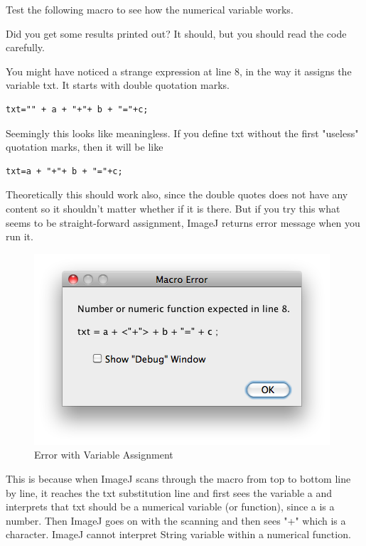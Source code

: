 \documentclass[11pt,a4paper,oneside]{report}
\begin{document}
Test the following macro to see how the numerical variable works. 

Did you get some results printed out? It should, but you should read the code carefully. 

You might have noticed a strange expression at line 8, in the way it assigns the variable txt. It starts with double quotation marks. \\
%
\begin{lstlisting}[numbers=none]
txt="" + a + "+"+ b + "="+c;
\end{lstlisting}
Seemingly this looks like meaningless. If you define txt without the first "useless" quotation marks, then it will be like\\
\begin{lstlisting}[numbers=none]
txt=a + "+"+ b + "="+c;
\end{lstlisting}
Theoretically this should work also, since the double quotes does not have any content so it shouldn't matter whether if it is there. But if you try this what seems to be straight-forward assignment, ImageJ returns error message when you run it. 

\begin{figure}[htbp]
\begin{center}
\includegraphics[scale=0.6]{fig/ErrorStringNumericFunction.png}
\caption{Error with Variable Assignment} \label{fig_ErrorVariable}
\end{center}
\end{figure}

This is because when ImageJ scans through the macro from top to bottom line by line, it reaches the txt substitution line and first sees the variable a and interprets that txt should be a numerical variable (or function), since a is a number. Then ImageJ goes on with the scanning and then sees "+" which is a character. ImageJ cannot interpret String variable within a numerical function. 
\end{document}
